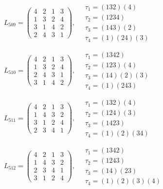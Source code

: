 $L_{509} = \begin{pmatrix} 4 & 2 & 1 & 3 \\ 1 & 3 & 2 & 4 \\ 3 & 1 & 4 & 2 \\ 2 & 4 & 3 & 1 \end{pmatrix}, \quad \begin{matrix} \tau_{1} = (1 3 2)(4) \\ \tau_{2} = (1 2 3 4) \\ \tau_{3} = (1 4 3)(2) \\ \tau_{4} = (1)(2 4)(3) \end{matrix}$

$L_{510} = \begin{pmatrix} 4 & 2 & 1 & 3 \\ 1 & 3 & 2 & 4 \\ 2 & 4 & 3 & 1 \\ 3 & 1 & 4 & 2 \end{pmatrix}, \quad \begin{matrix} \tau_{1} = (1 3 4 2) \\ \tau_{2} = (1 2 3)(4) \\ \tau_{3} = (1 4)(2)(3) \\ \tau_{4} = (1)(2 4 3) \end{matrix}$

$L_{511} = \begin{pmatrix} 4 & 2 & 1 & 3 \\ 1 & 4 & 3 & 2 \\ 3 & 1 & 2 & 4 \\ 2 & 3 & 4 & 1 \end{pmatrix}, \quad \begin{matrix} \tau_{1} = (1 3 2)(4) \\ \tau_{2} = (1 2 4)(3) \\ \tau_{3} = (1 4 2 3) \\ \tau_{4} = (1)(2)(3 4) \end{matrix}$

$L_{512} = \begin{pmatrix} 4 & 2 & 1 & 3 \\ 1 & 4 & 3 & 2 \\ 2 & 3 & 4 & 1 \\ 3 & 1 & 2 & 4 \end{pmatrix}, \quad \begin{matrix} \tau_{1} = (1 3 4 2) \\ \tau_{2} = (1 2 4 3) \\ \tau_{3} = (1 4)(2 3) \\ \tau_{4} = (1)(2)(3)(4) \end{matrix}$

